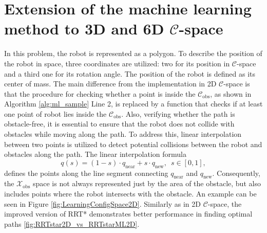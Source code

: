 \documentclass{ctuthesis}
\begin{document}
\section{Extension of the machine learning method to 3D and 6D $\mathcal{C}$-space}
In this problem, the robot is represented as a polygon. 
To describe the position of the robot in space, three coordinates are utilized: 
two for its position in $\mathcal{C}$-space and 
a third one for its rotation angle. 
The position of the robot is defined as its center of mass.
The main difference from the implementation in 2D $\mathcal{C}$-space is that 
the procedure for checking whether a point is inside the $\mathcal{C}_\text{obs}$,
as shown in Algorithm \ref{alg:ml_sample} Line 2,
is replaced by a function that checks if 
at least one point of robot lies inside the $\mathcal{C}_\text{obs}$. 
Also, verifying whether the path is obstacle-free, 
it is essential to ensure that 
the robot does not collide with obstacles while moving along the path.
To address this, 
linear interpolation between two points is utilized 
to detect potential collisions between the robot and obstacles along the path.
The linear interpolation formula \[ q(s) = (1 - s) \cdot q_{\text{near}} + s \cdot q_{\text{new}},\enspace s \in [0,1], \] 
defines the points along the line segment connecting \( q_{\text{near}} \) and \( q_{\text{new}} \).
Consequently, the $\mathcal{X}_\text{obs}$ space is not always represented just by the 
area of the obstacle, but also includes points where the robot intersects 
with the obstacle. 
An example can be seen in Figure \ref{fig:LearningConfigSpace2D}.
Similarly as in 2D $\mathcal{C}$-space, 
the improved version of RRT* demonstrates better performance 
in finding optimal paths \ref{fig:RRTstar2D_vs_RRTstarML2D}. 
\end{document}
